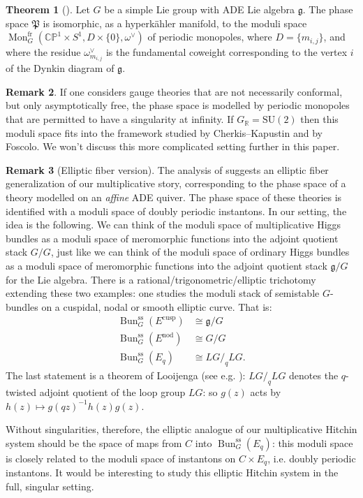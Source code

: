 \documentclass[11pt, oneside, reqno]{amsart}
\theoremstyle{definition} \newtheorem{definition}{Definition}[section]
\newtheorem{theorem}[definition]{Theorem}
\theoremstyle{definition} \newtheorem{remark}[definition]{Remark}
\theoremstyle{definition} \newtheorem{remarks}[definition]{Remarks}
\theoremstyle{definition} \newtheorem{question}[definition]{Question}
\theoremstyle{definition} \newtheorem*{note}{Note}
\theoremstyle{definition} \newtheorem{example}[definition]{Example}
\theoremstyle{definition} \newtheorem{examples}[definition]{Examples}
\renewcommand{\gg}{\mathfrak{g}}
\newcommand{\bb}[1]{\mathbb{#1}}
\newcommand{\mr}[1]{\mathrm{#1}}
\newcommand{\mf}[1]{\mathfrak{#1}}
\newcommand{\RR}{\mathbb{R}}
\newcommand{\SU}{\mathrm{SU}}
\newcommand{\iso}{\cong}
\DeclareMathOperator{\bun}{Bun}
\DeclareMathOperator{\mon}{Mon}
\newcommand{\fr}{\mathrm{fr}}
\begin{document}
\begin{theorem}[{\cite[Section 8.1]{NekrasovPestun}}]
Let $G$ be a simple Lie group with ADE Lie algebra $\gg$.  The phase space $\mf P$ is isomorphic, as a hyperk\"ahler manifold, to the moduli space $\mon_G^\fr(\bb{CP}^1 \times S^1,D \times\{0\},\omega^\vee)$ of periodic monopoles, where $D = \{m_{i,j}\}$, and where the residue $\omega^\vee_{m_{i,j}}$ is the fundamental coweight corresponding to the vertex $i$ of the Dynkin diagram of $\gg$.
\end{theorem}

\begin{remark}
If one considers gauge theories that are not necessarily conformal, but only asymptotically free, the phase space is modelled by periodic monopoles that are permitted to have a singularity at infinity.  If $G_\RR = \SU(2)$ then this moduli space fits into the framework studied by Cherkis--Kapustin and by Foscolo.  We won't discuss this more complicated setting further in this paper.
\end{remark}

\begin{remark}[Elliptic fiber version]
  The analysis of \cite{NekrasovPestun} suggests an elliptic fiber
  generalization of our multiplicative story, corresponding to the
  phase space of a theory modelled on an \emph{affine} ADE quiver.
  The phase space of these theories is identified with a moduli space
  of doubly periodic instantons.  In our setting, the idea is the
  following.  We can think of the moduli space of multiplicative Higgs
  bundles as a moduli space of meromorphic functions into the adjoint
  quotient stack $G/G$, just like we can think of the moduli space of
  ordinary Higgs bundles as a moduli space of meromorphic functions
  into the adjoint quotient stack $\gg/G$ for the Lie algebra.  There
  is a rational/trigonometric/elliptic trichotomy extending these two
  examples: one studies the moduli stack of semistable $G$-bundles on
  a cuspidal, nodal or smooth elliptic curve.  That is:
\begin{align*}
\bun^{\mr{ss}}_G(E^{\mr{cusp}}) &\iso \gg/G \\
\bun^{\mr{ss}}_G(E^{\mr{nod}}) &\iso G/G \\
\bun^{\mr{ss}}_G(E_q) &\iso LG/_q LG.
\end{align*}
The last statement is a theorem of Looijenga (see e.g. \cite{Laszlo}): $LG/_q LG$ denotes the $q$-twisted adjoint quotient of the loop group $LG$: so $g(z)$ acts by $h(z) \mapsto g(qz)^{-1}h(z)g(z)$.  

Without singularities, therefore, the elliptic analogue of our
multiplicative Hitchin system should be the space of maps from $C$
into $\bun^{\mr{ss}}_G(E_q)$: this moduli space is closely related to
the moduli space of instantons on $C \times E_q$, i.e. doubly periodic
instantons.  It would be interesting to study this elliptic Hitchin
system in the full, singular setting.
\end{remark}
\end{document}
